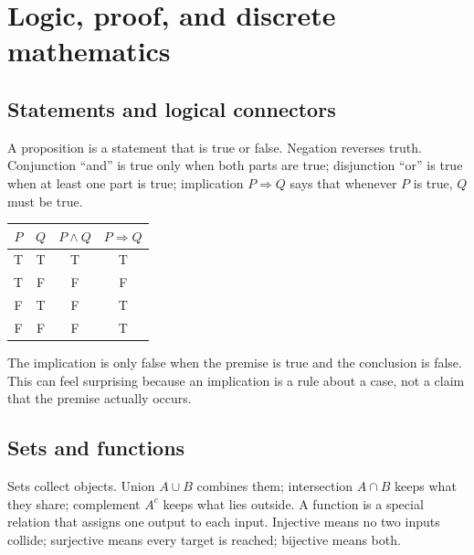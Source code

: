 \documentclass[11pt,oneside,openany]{book}
\begin{document}
\chapter{Logic, proof, and discrete mathematics}

\section{Statements and logical connectors}

A proposition is a statement that is true or false. Negation reverses truth. Conjunction ``and'' is true only when both parts are true; disjunction ``or'' is true when at least one part is true; implication $P\Rightarrow Q$ says that whenever $P$ is true, $Q$ must be true.

\begin{center}
\begin{tabular}{c c c c}
\toprule
$P$ & $Q$ & $P\land Q$ & $P\Rightarrow Q$\\
\midrule
T&T&T&T\\
T&F&F&F\\
F&T&F&T\\
F&F&F&T\\
\bottomrule
\end{tabular}
\end{center}

The implication is only false when the premise is true and the conclusion is false. This can feel surprising because an implication is a rule about a case, not a claim that the premise actually occurs.

\section{Sets and functions}

Sets collect objects. Union $A\cup B$ combines them; intersection $A\cap B$ keeps what they share; complement $A^c$ keeps what lies outside. A function is a special relation that assigns one output to each input. Injective means no two inputs collide; surjective means every target is reached; bijective means both.

\begin{center}
\end{center}
\end{document}
